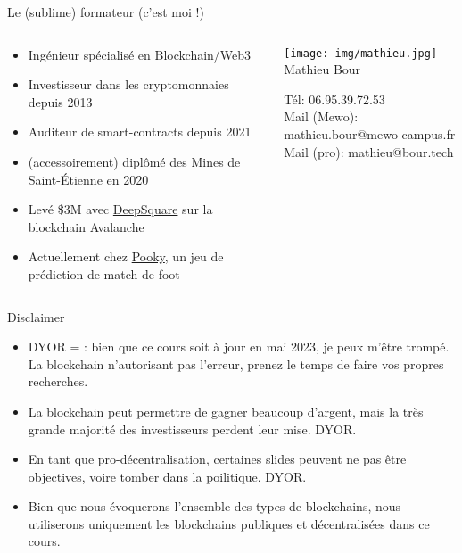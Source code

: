 
\begin{frame}{Le (sublime) formateur (c'est moi !)}


  \begin{columns}
    \begin{column}{0.5\textwidth}
      \begin{itemize}
        \item Ingénieur spécialisé en Blockchain/Web3
        \item Investisseur dans les cryptomonnaies depuis 2013
        \item Auditeur de smart-contracts depuis 2021
        \item (accessoirement) diplômé des Mines de Saint-Étienne en 2020
        \item Levé \$3M avec \href{https://deepsquare.io}{DeepSquare} sur la blockchain Avalanche
        \item Actuellement chez \href{https://pooky.gg}{Pooky}, un jeu de prédiction de match de foot
      \end{itemize}
    \end{column}

    \begin{column}{0.5\textwidth}  %
      \begin{center}
        \texttt{[image: img/mathieu.jpg]} \\
        Mathieu Bour

        Tél: 06.95.39.72.53 \\
        Mail (Mewo): mathieu.bour@mewo-campus.fr \\
        Mail (pro): mathieu@bour.tech
      \end{center}
    \end{column}
  \end{columns}
\end{frame}


\begin{frame}{Disclaimer}
  \begin{itemize}
    \item DYOR =  : bien que ce cours soit à jour en mai 2023, je peux m'être trompé. La blockchain n'autorisant pas l'erreur, prenez le temps de faire vos propres recherches.
    \item La blockchain peut permettre de gagner beaucoup d'argent, mais la très grande majorité des investisseurs perdent leur mise. DYOR.
    \item En tant que pro-décentralisation, certaines slides peuvent ne pas être objectives, voire tomber dans la poilitique. DYOR.
    \item Bien que nous évoquerons l'ensemble des types de blockchains, nous utiliserons uniquement les blockchains publiques et décentralisées dans ce cours.
  \end{itemize}
\end{frame}